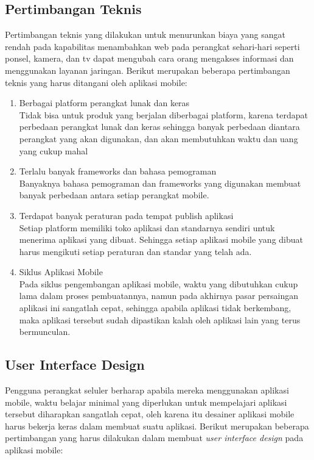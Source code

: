 \subsection{Pertimbangan Teknis}
\label{sec:teknis}
Pertimbangan teknis yang dilakukan untuk menurunkan biaya yang sangat rendah pada kapabilitas menambahkan web pada perangkat sehari-hari seperti ponsel, kamera, dan tv dapat mengubah cara orang mengakses informasi dan menggunakan layanan jaringan. Berikut merupakan beberapa pertimbangan teknis yang harus ditangani oleh aplikasi mobile: 

\begin{enumerate}
	\item Berbagai platform perangkat lunak dan keras \\
	Tidak bisa untuk produk yang berjalan diberbagai platform, karena terdapat perbedaan perangkat lunak dan keras sehingga banyak perbedaan diantara perangkat yang akan digunakan, dan akan membutuhkan waktu dan uang yang cukup mahal
	\item Terlalu banyak frameworks dan bahasa pemograman \\
	Banyaknya bahasa pemograman dan frameworks yang digunakan membuat banyak perbedaan antara setiap perangkat mobile.
	\item Terdapat banyak peraturan pada tempat publish aplikasi \\
	Setiap platform memiliki toko aplikasi dan standarnya sendiri untuk menerima aplikasi yang dibuat. Sehingga setiap aplikasi mobile yang dibuat harus mengikuti setiap peraturan dan standar yang telah ada.
	\item Siklus Aplikasi Mobile \\
	Pada siklus pengembangan aplikasi mobile, waktu yang dibutuhkan cukup lama dalam proses pembuatannya, namun pada akhirnya pasar persaingan aplikasi ini sangatlah cepat, sehingga apabila aplikasi tidak berkembang, maka aplikasi tersebut sudah dipastikan kalah oleh aplikasi lain yang terus bermunculan.
\end{enumerate}

\subsection{User Interface Design}
\label{sec:ui}
Pengguna perangkat seluler berharap apabila mereka menggunakan aplikasi mobile, waktu belajar minimal yang diperlukan untuk mempelajari aplikasi tersebut diharapkan sangatlah cepat, oleh karena itu desainer aplikasi mobile harus bekerja keras dalam membuat suatu aplikasi. Berikut merupakan beberapa pertimbangan yang harus dilakukan dalam membuat \textit{user interface design} pada aplikasi mobile:

